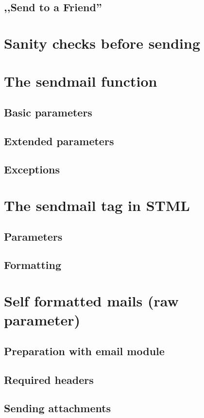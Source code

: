 \documentclass{article}
\begin{document}
\subsection{,,Send to a Friend''}

\section{Sanity checks before sending}

\section{The sendmail function}
\subsection{Basic parameters}
\subsection{Extended parameters}
\subsection{Exceptions}

\section{The sendmail tag in STML}
\subsection{Parameters}
\subsection{Formatting}

\section{Self formatted mails (raw parameter)}
\subsection{Preparation with email module}
\subsection{Required headers}
\subsection{Sending attachments}
\end{document}
